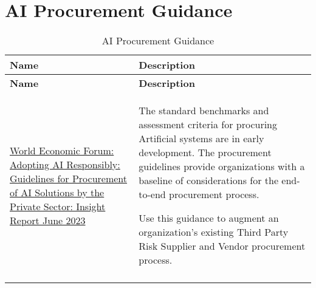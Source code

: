 
\clearpage
\section{AI Procurement Guidance}

\setlength\LTleft{0pt}
\setlength\LTright{0pt}
\begin{longtable}[c]{|p{}|p{}|}
  \hline
  \rowcolor{owasplightpurple}
  \textbf{Name} &
  \textbf{Description} \\
  \hline
  \endfirsthead
  \hline
  \rowcolor{owasplightpurple}
  \textbf{Name} &
  \textbf{Description} \\
  \hline
  \endhead
  \endfoot
  \href{https://www3.weforum.org/docs/WEF_Adopting_AI_Responsibly_Guidelines_for_Procurement_of_AI_Solutions_by_the_Private_Sector_2023.pdf}{World Economic Forum: Adopting AI Responsibly: Guidelines for Procurement of AI Solutions by the Private Sector: Insight Report June 2023} &
  The standard benchmarks and assessment criteria for procuring Artificial
  systems are in early development. The procurement guidelines provide
  organizations with a baseline of considerations for the end-to-end
  procurement process.

  Use this guidance to augment an organization's existing Third Party Risk
  Supplier and Vendor procurement process. \\
  \hline
  \caption{AI Procurement Guidance}
  \label{tab:ai-procurement-guidance}
\end{longtable}